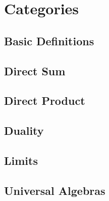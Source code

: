 \section{Categories}

\subsection{Basic Definitions}

\subsection{Direct Sum}

\subsection{Direct Product}

\subsection{Duality}

\subsection{Limits}

\subsection{Universal Algebras}
